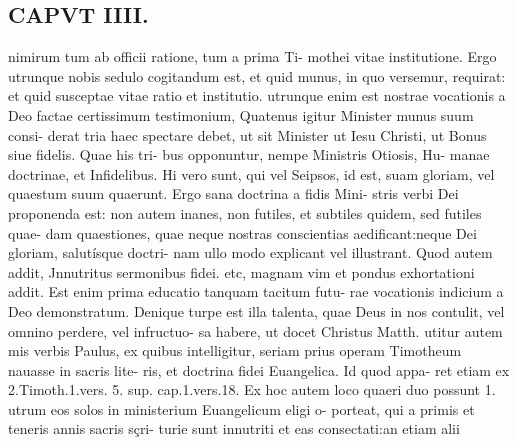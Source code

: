\documentclass{article}
\begin{document}
\begin{pages}
\section*{CAPVT  IIII. }
\marginpar{[ p.201 ]}nimirum tum ab officii ratione, tum a prima Ti- mothei vitae institutione. Ergo utrunque nobis sedulo cogitandum est, et quid munus, in quo versemur, requirat: et quid susceptae vitae ratio et institutio. utrunque enim est nostrae vocationis a Deo factae certissimum testimonium, Quatenus igitur Minister munus suum consi- derat tria haec spectare debet, ut sit Minister ut Iesu Christi, ut Bonus siue fidelis. Quae his tri- bus opponuntur, nempe Ministris Otiosis, Hu- manae doctrinae, et Infidelibus. Hi vero sunt, qui vel Seipsos, id est, suam gloriam, vel quaestum suum quaerunt. Ergo sana doctrina a fidis Mini- stris verbi Dei proponenda est: non autem inanes, non futiles, et subtiles quidem, sed futiles quae- dam quaestiones, quae neque nostras conscientias aedificant:neque Dei gloriam, salutísque doctri- nam ullo modo explicant vel illustrant. Quod autem addit, Jnnutritus sermonibus fidei. etc, magnam vim et pondus exhortationi addit. Est enim prima educatio tanquam tacitum futu- rae vocationis indicium a Deo demonstratum. Denique turpe est illa talenta, quae Deus in nos contulit, vel omnino perdere, vel infructuo- sa habere, ut docet Christus Matth. utitur autem mis verbis Paulus, ex quibus intelligitur, seriam prius operam Timotheum nauasse in sacris lite- ris, et doctrina fidei Euangelica. Id quod appa- ret etiam ex 2.Timoth.1.vers. 5. sup. cap.1.vers.18. Ex hoc autem loco quaeri duo possunt 1. utrum eos solos in ministerium Euangelicum eligi o- porteat, qui a primis et teneris annis sacris sçri- turie sunt innutriti et eas consectati:an etiam alii 

\end{pages}
\end{document}
